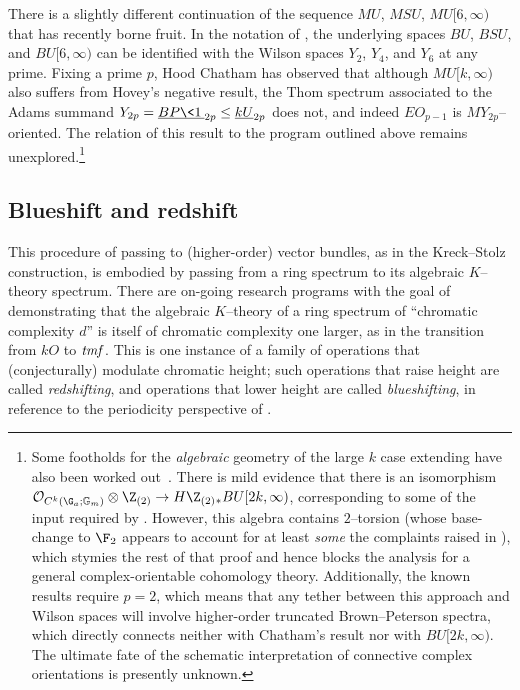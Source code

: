 There is a slightly different continuation of the sequence \(MU\), \(MSU\), \(MU[6, \infty)\) that has recently borne fruit.  In the notation of , the underlying spaces \(BU\), \(BSU\), and \(BU[6, \infty)\) can be identified with the Wilson spaces \(Y_2\), \(Y_4\), and \(Y_6\) at any prime.  Fixing a prime \(p\), Hood Chatham has observed that although \(MU[k, \infty)\) also suffers from Hovey's negative result, the Thom spectrum associated to the Adams summand \(Y_{2p} = \OS{BP\<1\>}{2p} \le \OS{kU}{2p}\) does not, and indeed \(EO_{p-1}\) is \(MY_{2p}\)--oriented.  The relation of this result to the program outlined above remains unexplored.\footnote{Some footholds for the \emph{algebraic} geometry of the large \(k\) case extending  have also been worked out~\cite{HLP}.  There is mild evidence that there is an isomorphism $\sheaf O_{C^k(\G_a; \Gm)} \otimes \Z_{(2)} \to H\Z_{(2)}{}_* BU[2k, \infty)$, corresponding to some of the input required by .  However, this algebra contains \(2\)--torsion (whose base-change to \(\F_2\) appears to account for at least \emph{some} the complaints raised in \cite[Remark 8.1]{HLP}), which stymies the rest of that proof and hence blocks the analysis for a general complex-orientable cohomology theory.  Additionally, the known results require \(p = 2\), which means that any tether between this approach and Wilson spaces will involve higher-order truncated Brown--Peterson spectra, which directly connects neither with Chatham's result nor with \(BU[2k, \infty)\).  The ultimate fate of the schematic interpretation of connective complex orientations is presently unknown.}








\subsection*{Blueshift and redshift}

This procedure of passing to (higher-order) vector bundles, as in the Kreck--Stolz construction, is embodied by passing from a ring spectrum to its algebraic \(K\)--theory spectrum.  There are on-going research programs with the goal of demonstrating that the algebraic \(K\)--theory of a ring spectrum of ``chromatic complexity \(d\)'' is itself of chromatic complexity one larger, as in the transition from \(kO\) to \(\mathit{tmf}\).  This is one instance of a family of operations that (conjecturally) modulate chromatic height; such operations that raise height are called \textit{redshifting}, and operations that lower height are called \textit{blueshifting}, in reference to the periodicity perspective of .

